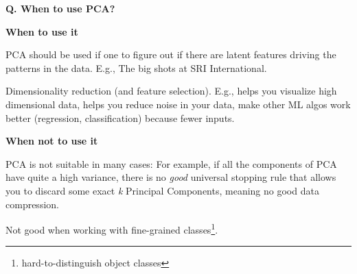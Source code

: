 \begin{frame}[fragile]{\textbf{Q. When to use PCA?}}
  \vspace{.4em}
  \begin{wideitemize}
    \item \textbf{When to use it}
    \begin{wideitemize}
      \item PCA should be used if one to figure out if there are latent features
      driving the patterns in the data. E.g., The big shots at SRI International.
      \item Dimensionality reduction (and feature selection). E.g., helps you
      visualize high dimensional data, helps you reduce noise in your data, make
      other ML algos work better (regression, classification) because fewer inputs.
    \end{wideitemize}
    \item \textbf{When not to use it}
    \begin{wideitemize}
      \item PCA is not suitable in many cases: For example, if all the components of PCA
      have quite a high variance, there is no \textit{good} universal stopping rule that
      allows you to discard some exact \textit{k} Principal Components, meaning no good
      data compression.
      \item Not good when working with fine-grained classes\footnote{hard-to-distinguish object classes}.
    \end{wideitemize}
  \end{wideitemize}
\end{frame}


